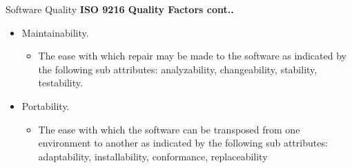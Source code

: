 \documentclass{beamer}
\begin{document}
\begin{frame}{Software Quality}
	\textbf{ISO 9216 Quality Factors cont..}
	\begin{itemize}
		\item Maintainability.
		\begin{itemize}
			\item  The ease with which repair may be made to the software as indicated by the following sub attributes: analyzability, changeability, stability, testability.
		\end{itemize}
		\item Portability. 
		\begin{itemize}
			\item The ease with which the software can be transposed from one environment to another as indicated by the following sub attributes: adaptability, installability, conformance, replaceability
		\end{itemize}
		
	\end{itemize}
\end{frame}
\end{document}
